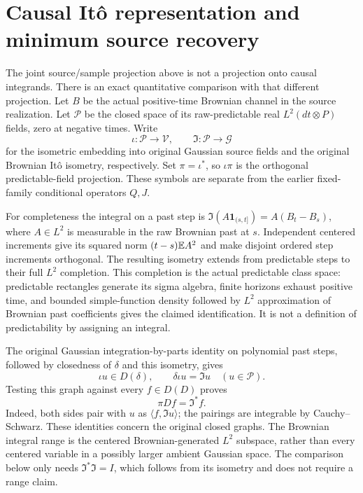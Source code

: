 \documentclass[11pt]{article}
\begin{document}
\section{Causal It\^o representation and minimum source recovery}
The joint source/sample projection above is not a projection onto
causal integrands. There is an exact quantitative comparison with
that different projection. Let $B$ be the actual positive-time
Brownian channel in the source realization. Let $\mathcal P$ be the
closed space of its raw-predictable real $L^2(dt\otimes P)$ fields,
zero at negative times. Write
\[
 \iota:\mathcal P\longrightarrow\mathcal V,\qquad
 \mathfrak I:\mathcal P\longrightarrow\mathcal G
\]
for the isometric embedding into original Gaussian source fields
and the original Brownian It\^o isometry, respectively. Set
$\pi=\iota^*$, so $\iota\pi$ is the orthogonal predictable-field
projection. These symbols are separate from the earlier fixed-family
conditional operators $Q,J$.

For completeness the integral on a past step is
$\mathfrak I(A\mathbf1_{(s,t]})=A(B_t-B_s)$, where $A\in L^2$
is measurable in the raw Brownian past at $s$. Independent centered
increments give its squared norm $(t-s)\mathbb E A^2$ and make disjoint
ordered step increments orthogonal. The resulting isometry extends
from predictable steps to their full $L^2$ completion. This completion
is the actual predictable class space: predictable rectangles generate
its sigma algebra, finite horizons exhaust positive time, and bounded
simple-function density followed by $L^2$ approximation of Brownian
past coefficients gives the claimed identification. It is not a
definition of predictability by assigning an integral.

The original Gaussian integration-by-parts identity on polynomial
past steps, followed by closedness of $\delta$ and this isometry,
gives
\begin{equation}\label{eq:causaldivgraph}
 \iota u\in D(\delta),\qquad\delta\iota u=\mathfrak Iu
                  \quad(u\in\mathcal P).
\end{equation}
Testing this graph against every $f\in D(D)$ proves
\begin{equation}\label{eq:causaladjoint}
 \pi Df=\mathfrak I^*f.
\end{equation}
Indeed, both sides pair with $u$ as $\langle f,\mathfrak Iu\rangle$;
the pairings are integrable by Cauchy--Schwarz. These identities
concern the original closed graphs. The Brownian integral range is
the centered Brownian-generated $L^2$ subspace, rather than every
centered variable in a possibly larger ambient Gaussian space.
The comparison below only needs $\mathfrak I^*\mathfrak I=I$,
which follows from its isometry and does not require a range claim.
\end{document}
